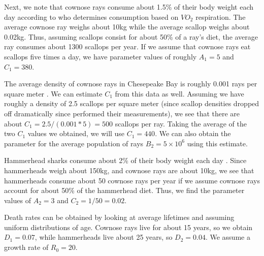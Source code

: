 \documentclass[12pt,journal,compsoc,twoside]{IEEEtran}
\begin{document}
Next, we note that cownose rays consume about 1.5\% of their body weight each day according to \cite{Neer(2005)} who determines consumption based on $VO_2$ respiration. The average cownose ray weighs about 10kg while the average scallop weighs about 0.02kg. Thus, assuming scallops consist for about 50\% of a ray's diet, the average ray consumes about 1300 scallops per year. If we assume that cownose rays eat scallops five times a day, we have parameter values of roughly $A_1 = 5$ and $C_1 =380$. 

The average density of cownose rays in Chesepeake Bay is roughly 0.001 rays per square meter \cite{Blaylock(1993)}. We can estimate $C_1$ from this data as well. Assuming we have roughly a density of 2.5 scallops per square meter (since scallop densities dropped off dramatically since \cite{Fay(1983)} performed their measurements), we see that there are about $C_1 = 2.5/(0.001*5) = 500$ scallops per ray. Taking the average of the two $C_1$ values we obtained, we will use $C_1 =  440$. We can also obtain the parameter for the average population of rays $B_2 = 5 \times 10^{6}$ using this estimate.

Hammerhead sharks consume about 2\% of their body weight each day \cite{Bush(2002)}. Since hammerheads weigh about 150kg, and cownose rays are about 10kg, we see that hammerheads consume about 50 cownose rays per year if we assume cownose rays account for about 50\% of the hammerhead diet. Thus, we find the parameter values of $A_2 = 3$ and $ C_2 = 1/50 = 0.02$.  

Death rates can be obtained by looking at average lifetimes and assuming uniform distributions of age. Cownose rays live for about 15 years, so we obtain $D_1 = 0.07$, while hammerheads live about 25 years, so $D_2 = 0.04$. We assume a growth rate of $R_0 = 20$. 
\end{document}
